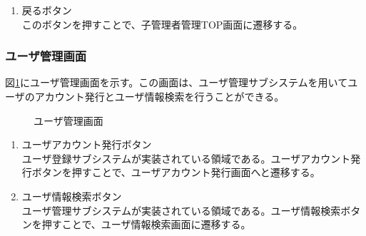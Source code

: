 \documentclass[a4j]{jarticle}
\begin{document}
\begin{enumerate}
  \renewcommand{\labelenumi}{\textcircled{\scriptsize \theenumi}}
\item 戻るボタン\\
  このボタンを押すことで、子管理者管理TOP画面に遷移する。
\end{enumerate}



\subsubsection{ユーザ管理画面}
図\ref{fig:user_admin_top}にユーザ管理画面を示す。この画面は、ユーザ管理サブシステムを用いてユーザのアカウント発行とユーザ情報検索を行うことができる。
\begin{figure}[H]
\centering
{}
\caption{ユーザ管理画面}
\label{fig:user_admin_top}
\end{figure}

\begin{enumerate}
  \renewcommand{\labelenumi}{\textcircled{\scriptsize \theenumi}}

\item ユーザアカウント発行ボタン\\
ユーザ登録サブシステムが実装されている領域である。ユーザアカウント発行ボタンを押すことで、ユーザアカウント発行画面へと遷移する。

\item ユーザ情報検索ボタン\\
ユーザ管理サブシステムが実装されている領域である。ユーザ情報検索ボタンを押すことで、ユーザ情報検索画面に遷移する。

\end{enumerate}
\end{document}
